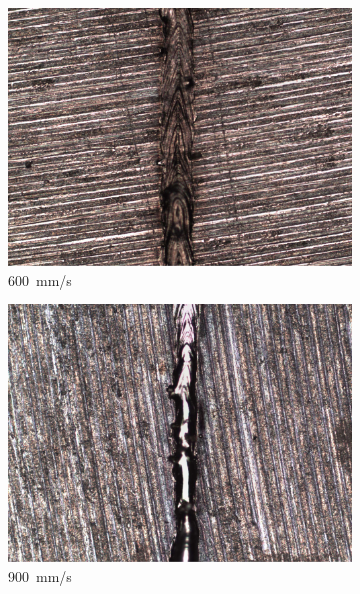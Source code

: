 \documentclass{article}
\begin{document}
\begin{figure}
\begin{subfigure}[b]{0.24\textwidth}
    \end{subfigure}\:
    \begin{subfigure}[b]{0.24\textwidth}
        \includegraphics[width=\textwidth]{experiment/photos/90W_V600}
        \caption{\SI{600}{mm/s}}
    \end{subfigure}\:
    \begin{subfigure}[b]{0.24\textwidth}
        \includegraphics[width=\textwidth]{experiment/photos/90W_V900}
        \caption{\SI{900}{mm/s}}
    \end{subfigure}\\[6pt]
    \begin{subfigure}[b]{0.24\textwidth}

\end{subfigure}
\end{figure}
\end{document}
